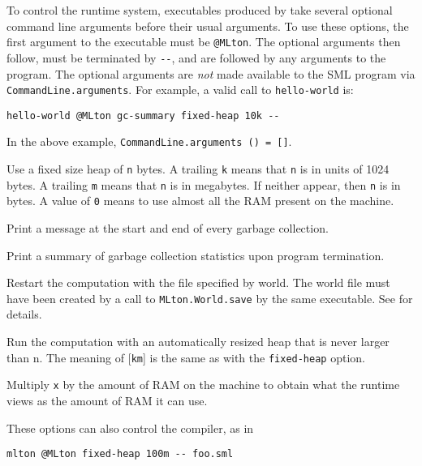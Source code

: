 %
%
%
%
%
%


To control the runtime system, executables produced by {\mlton} take
several optional command line arguments before their usual arguments.
To use these options, the first argument to the executable must be
\verb+@MLton+.  The optional arguments then follow, must be
terminated by \verb+--+, and are followed by any arguments to the program.
The optional arguments are {\em not} made available to the SML
program via {\tt CommandLine.arguments}.  For example, a valid call
to {\tt hello-world} is: 
\begin{verbatim}
hello-world @MLton gc-summary fixed-heap 10k --
\end{verbatim}
In the above example, {\tt CommandLine.arguments () = []}.

\begin{description}
 Use a fixed size heap of {\tt n} bytes.
 A trailing {\tt k} means that {\tt n} is in units of 1024 bytes. 
 A trailing {\tt m} means that {\tt n} is in megabytes. 
 If neither appear, then {\tt n} is in bytes.
 A value of {\tt 0} means to use almost all the RAM present on the
 machine.

Print a message at the start and end of every garbage collection.

Print a summary of garbage collection statistics upon program
termination.

Restart the computation with the file specified by world.
The world file must have been created by a call to
{\tt MLton.World.save} by the same executable.  See 
for details.

Run the computation with an automatically resized heap that is never
larger than n.  The meaning of [{\tt km}] is the same as with the
{\tt fixed-heap} option.

Multiply {\tt x} by the amount of RAM on the machine to obtain what
the runtime views as the amount of RAM it can use.
\end{description}
These options can also control the compiler, as in
\begin{verbatim}
mlton @MLton fixed-heap 100m -- foo.sml
\end{verbatim}
